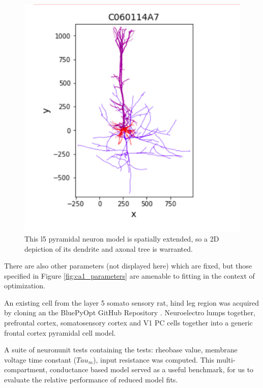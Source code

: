 \begin{figure}%
  \begin{center}
    \includegraphics[scale=0.8]{figures/morphology_view.png}
    \caption[l5 pyramidal neuron tree]{This l5 pyramidal neuron model is spatially extended, so a 2D depiction of its dendrite and axonal tree is warranted.}
  \label{fig:brief_shape}
  \end{center}
\end{figure}


There are also other parameters (not displayed here) which are fixed, but those specified in Figure  \ref{fig:ca1_parameters} are amenable to fitting in the context of optimization.


An existing cell from the layer 5 somato sensory rat, hind leg region was acquired by cloning an the BluePyOpt GitHub Repository \cite{van2016bluepyopt}.
Neuroelectro lumps together, prefrontal cortex, somatosensory cortex and V1 PC cells together into a generic frontal cortex pyramidal cell model. 


%
A suite of neuronunit tests containing the tests: rheobase value, membrane voltage time constant ($Tau_{m}$), input resistance was computed. This multi-compartment, conductance based model served as a useful benchmark, for us to evaluate the relative performance of reduced model fits. 

